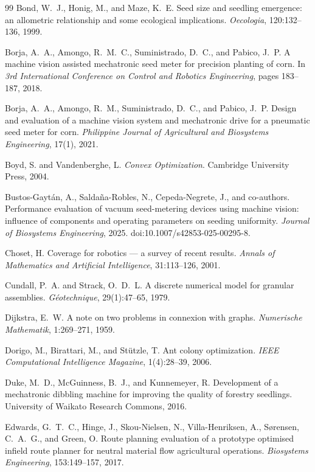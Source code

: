 \begin{thebibliography}{99}
Bond, W.~J., Honig, M., and Maze, K.~E.
Seed size and seedling emergence: an allometric relationship and some ecological implications.
\textit{Oecologia}, 120:132--136, 1999.

Borja, A.~A., Amongo, R.~M.~C., Suministrado, D.~C., and Pabico, J.~P.
A machine vision assisted mechatronic seed meter for precision planting of corn.
In \textit{3rd International Conference on Control and Robotics Engineering}, pages 183--187, 2018.

Borja, A.~A., Amongo, R.~M., Suministrado, D.~C., and Pabico, J.~P.
Design and evaluation of a machine vision system and mechatronic drive for a pneumatic seed meter for corn.
\textit{Philippine Journal of Agricultural and Biosystems Engineering}, 17(1), 2021.

Boyd, S. and Vandenberghe, L.
\textit{Convex Optimization}.
Cambridge University Press, 2004.

Bustos-Gayt{\'a}n, A., Salda{\~n}a-Robles, N., Cepeda-Negrete, J., and co-authors.
Performance evaluation of vacuum seed-metering devices using machine vision: influence of components and operating parameters on seeding uniformity.
\textit{Journal of Biosystems Engineering}, 2025.
doi:10.1007/s42853-025-00295-8.

Choset, H.
Coverage for robotics --- a survey of recent results.
\textit{Annals of Mathematics and Artificial Intelligence}, 31:113--126, 2001.

Cundall, P.~A. and Strack, O.~D.~L.
A discrete numerical model for granular assemblies.
\textit{G{\'e}otechnique}, 29(1):47--65, 1979.

Dijkstra, E.~W.
A note on two problems in connexion with graphs.
\textit{Numerische Mathematik}, 1:269--271, 1959.

Dorigo, M., Birattari, M., and St{\"u}tzle, T.
Ant colony optimization.
\textit{IEEE Computational Intelligence Magazine}, 1(4):28--39, 2006.

Duke, M.~D., McGuinness, B.~J., and Kunnemeyer, R.
Development of a mechatronic dibbling machine for improving the quality of forestry seedlings.
University of Waikato Research Commons, 2016.

Edwards, G.~T.~C., Hinge, J., Skou-Nielsen, N., Villa-Henriksen, A., S{\o}rensen, C.~A.~G., and Green, O.
Route planning evaluation of a prototype optimised infield route planner for neutral material flow agricultural operations.
\textit{Biosystems Engineering}, 153:149--157, 2017.


\end{thebibliography}
